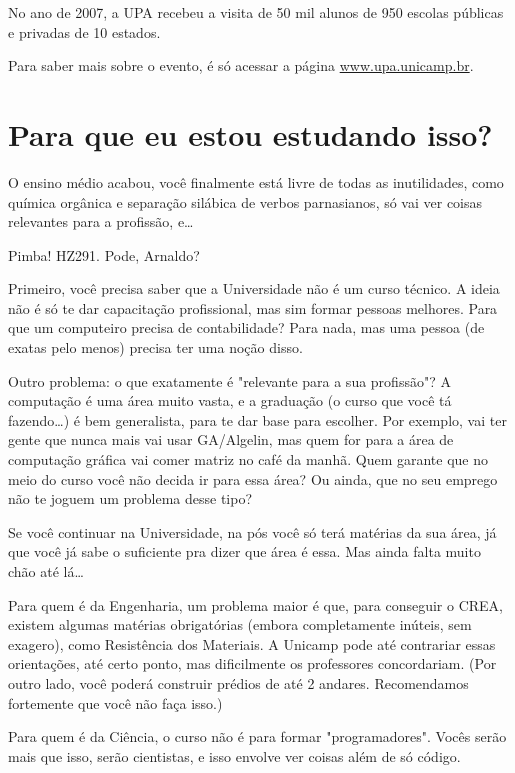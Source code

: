No ano de 2007, a UPA recebeu a visita de 50 mil alunos de 950 escolas públicas
e privadas de 10 estados.

Para saber mais sobre o evento, é só acessar a página
\url{www.upa.unicamp.br}.

\section{Para que eu estou estudando isso?}

O ensino médio acabou, você finalmente está livre de todas as inutilidades, como
química orgânica e separação silábica de verbos parnasianos, só vai ver coisas
relevantes para a profissão, e{\dots}

Pimba! HZ291. Pode, Arnaldo?

Primeiro, você precisa saber que a Universidade não é um curso técnico. A ideia
não é só te dar capacitação profissional, mas sim formar pessoas melhores. Para
que um computeiro precisa de contabilidade? Para nada, mas uma pessoa (de exatas
pelo menos) precisa ter uma noção disso.

Outro problema: o que exatamente é "relevante para a sua profissão"?
A computação é uma área muito vasta, e a graduação (o curso que você tá
fazendo{\dots}) é bem generalista, para te dar base para escolher. Por exemplo,
vai ter gente que nunca mais vai usar GA/Algelin, mas quem for para a área de
computação gráfica vai comer matriz no café da manhã. Quem garante que no meio
do curso você não decida ir para essa área? Ou ainda, que no seu emprego não te
joguem um problema desse tipo?

Se você continuar na Universidade, na pós você só terá matérias da sua área, já
que você já sabe o suficiente pra dizer que área é essa. Mas ainda falta muito
chão até lá{\dots}

Para quem é da Engenharia, um problema maior é que, para conseguir o CREA,
existem algumas matérias obrigatórias (embora completamente inúteis, sem
exagero), como Resistência dos Materiais. A Unicamp pode até contrariar essas orientações, até
certo ponto, mas dificilmente os professores concordariam. (Por outro lado,
você poderá construir prédios de até 2 andares. Recomendamos fortemente que você
não faça isso.)

Para quem é da Ciência, o curso não é para formar "programadores". Vocês serão
mais que isso, serão cientistas, e isso envolve ver coisas além de só código.
